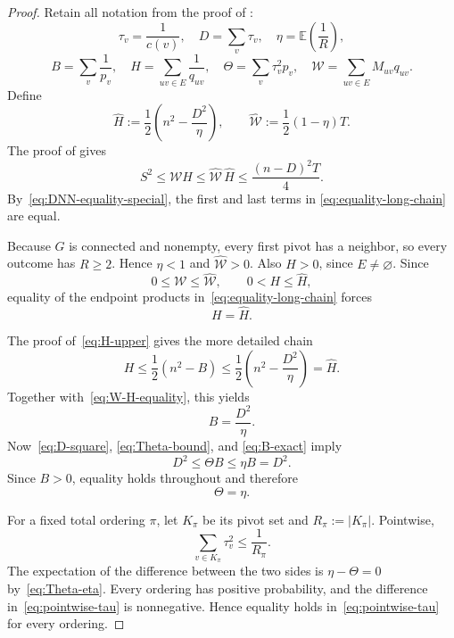 \documentclass[10pt,a4paper]{amsart}
\newcommand{\E}{\mathbb E}
\begin{document}
	\begin{proof}
		Retain all notation from the proof of :
		\[
		\tau_v=\frac1{c(v)},
		\quad
		D=\sum_v\tau_v,
		\quad
		\eta=\E\left(\frac1R\right),
		\]
		\[
		B=\sum_v\frac1{p_v},
		\quad
		H=\sum_{uv\in E}\frac1{q_{uv}},
		\quad
		\Theta=\sum_v\tau_v^2p_v,
		\quad
		\mathcal W=\sum_{uv\in E}M_{uv}q_{uv}.
		\]
		Define
		\begin{equation}\label{eq:upper-H-W}
			\widehat H
			:=\frac12\left(n^2-\frac{D^2}{\eta}\right),
			\qquad
			\widehat{\mathcal W}
			:=\frac12(1-\eta)T.
		\end{equation}
		The proof of  gives
		\begin{equation}\label{eq:equality-long-chain}
			S^2
			\leq\mathcal W H
			\leq\widehat{\mathcal W}\,\widehat H
			\leq\frac{(n-D)^2T}{4}.
		\end{equation}
		By~\eqref{eq:DNN-equality-special}, the first and last terms in
		\eqref{eq:equality-long-chain} are equal.
		
		Because $G$ is connected and nonempty, every first pivot has a neighbor,
		so every outcome has $R\geq2$.  Hence $\eta<1$ and
		$\widehat{\mathcal W}>0$.  Also $H>0$, since $E\neq\varnothing$.
		Since
		\[
		0\leq\mathcal W\leq\widehat{\mathcal W},
		\qquad
		0<H\leq\widehat H,
		\]
		equality of the endpoint products in~\eqref{eq:equality-long-chain}
		forces
		\begin{equation}\label{eq:W-H-equality}
			H=\widehat H.
		\end{equation}
		
		The proof of~\eqref{eq:H-upper} gives the more detailed chain
		\[
		H
		\leq\frac12(n^2-B)
		\leq\frac12\left(n^2-\frac{D^2}{\eta}\right)
		=\widehat H.
		\]
		Together with~\eqref{eq:W-H-equality}, this yields
		\begin{equation}\label{eq:B-exact}
			B=\frac{D^2}{\eta}.
		\end{equation}
		Now~\eqref{eq:D-square}, \eqref{eq:Theta-bound}, and
		\eqref{eq:B-exact} imply
		\[
		D^2\leq\Theta B\leq\eta B=D^2.
		\]
		Since $B>0$, equality holds throughout and therefore
		\begin{equation}\label{eq:Theta-eta}
			\Theta=\eta.
		\end{equation}
		
		For a fixed total ordering $\pi$, let $K_\pi$ be its pivot set and
		$R_\pi:=|K_\pi|$.  Pointwise,
		\begin{equation}\label{eq:pointwise-tau}
			\sum_{v\in K_\pi}\tau_v^2\leq\frac1{R_\pi}.
		\end{equation}
		The expectation of the difference between the two sides is
		$\eta-\Theta=0$ by~\eqref{eq:Theta-eta}.  Every ordering has positive
		probability, and the difference in~\eqref{eq:pointwise-tau} is
		nonnegative.  Hence equality holds in~\eqref{eq:pointwise-tau} for every
		ordering.
		

\end{proof}
\end{document}
